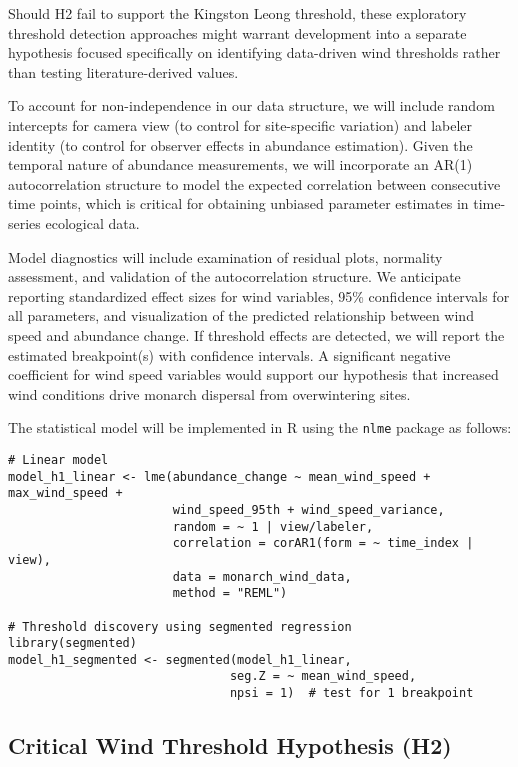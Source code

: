 Should H2 fail to support the Kingston Leong threshold, these exploratory threshold detection approaches might warrant development into a separate hypothesis focused specifically on identifying data-driven wind thresholds rather than testing literature-derived values.

To account for non-independence in our data structure, we will include random intercepts for camera view (to control for site-specific variation) and labeler identity (to control for observer effects in abundance estimation). Given the temporal nature of abundance measurements, we will incorporate an AR(1) autocorrelation structure to model the expected correlation between consecutive time points, which is critical for obtaining unbiased parameter estimates in time-series ecological data.

Model diagnostics will include examination of residual plots, normality assessment, and validation of the autocorrelation structure. We anticipate reporting standardized effect sizes for wind variables, 95\% confidence intervals for all parameters, and visualization of the predicted relationship between wind speed and abundance change. If threshold effects are detected, we will report the estimated breakpoint(s) with confidence intervals. A significant negative coefficient for wind speed variables would support our hypothesis that increased wind conditions drive monarch dispersal from overwintering sites.

The statistical model will be implemented in R using the \texttt{nlme} package as follows:

\begin{verbatim}
# Linear model
model_h1_linear <- lme(abundance_change ~ mean_wind_speed + max_wind_speed + 
                       wind_speed_95th + wind_speed_variance,
                       random = ~ 1 | view/labeler,
                       correlation = corAR1(form = ~ time_index | view),
                       data = monarch_wind_data,
                       method = "REML")

# Threshold discovery using segmented regression
library(segmented)
model_h1_segmented <- segmented(model_h1_linear, 
                               seg.Z = ~ mean_wind_speed,
                               npsi = 1)  # test for 1 breakpoint
\end{verbatim}

\subsection{Critical Wind Threshold Hypothesis (H2)}

